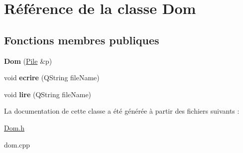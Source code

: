 \hypertarget{class_dom}{\section{Référence de la classe Dom}
\label{class_dom}
}
\subsection*{Fonctions membres publiques}
\begin{DoxyCompactItemize}
\item 
\hypertarget{class_dom_a76622d9817909851b9e7ba8a9b3d2614}{{\bfseries Dom} (\hyperlink{class_pile}{Pile} \&p)}\label{class_dom_a76622d9817909851b9e7ba8a9b3d2614}

\item 
\hypertarget{class_dom_a76e1a406daef8ed0e1bea3733575eb7f}{void {\bfseries ecrire} (Q\-String file\-Name)}\label{class_dom_a76e1a406daef8ed0e1bea3733575eb7f}

\item 
\hypertarget{class_dom_a0134557ad01388c484bb1661e1962ce1}{void {\bfseries lire} (Q\-String file\-Name)}\label{class_dom_a0134557ad01388c484bb1661e1962ce1}

\end{DoxyCompactItemize}


La documentation de cette classe a été générée à partir des fichiers suivants \-:\begin{DoxyCompactItemize}
\item 
\hyperlink{_dom_8h}{Dom.\-h}\item 
dom.\-cpp\end{DoxyCompactItemize}
